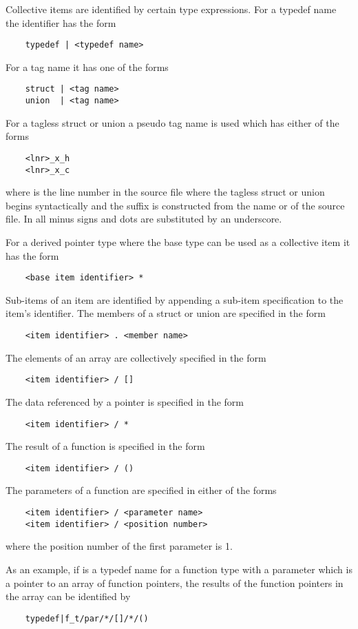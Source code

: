 Collective items are identified by certain type expressions. For a typedef name the identifier has the form
\begin{verbatim}
    typedef | <typedef name>
\end{verbatim}
For a tag name it has one of the forms
\begin{verbatim}
    struct | <tag name>
    union  | <tag name>
\end{verbatim}
For a tagless struct or union a pseudo tag name is used which has either of the forms
\begin{verbatim}
    <lnr>_x_h
    <lnr>_x_c
\end{verbatim}
where  is the line number in the source file where the tagless struct or union begins syntactically 
and the suffix is constructed from the name  or  of the source file. In  all minus signs
and dots are substituted by an underscore.

For a derived pointer type where the base type can be used as a collective item it has the form
\begin{verbatim}
    <base item identifier> *
\end{verbatim}

Sub-items of an item are identified by appending a sub-item specification to the item's identifier.
The members of a struct or union are specified in the form
\begin{verbatim}
    <item identifier> . <member name>
\end{verbatim}
The elements of an array are collectively specified in the form
\begin{verbatim}
    <item identifier> / []
\end{verbatim}
The data referenced by a pointer is specified in the form
\begin{verbatim}
    <item identifier> / *
\end{verbatim}
The result of a function is specified in the form
\begin{verbatim}
    <item identifier> / ()
\end{verbatim}
The parameters of a function are specified in either of the forms
\begin{verbatim}
    <item identifier> / <parameter name>
    <item identifier> / <position number>
\end{verbatim}
where the position number of the first parameter is 1.

As an example, if  is a typedef name for a function type with a parameter  
which is a pointer to an array of function pointers, the results of the function pointers in the
array can be identified by 
\begin{verbatim}
    typedef|f_t/par/*/[]/*/()
\end{verbatim}


